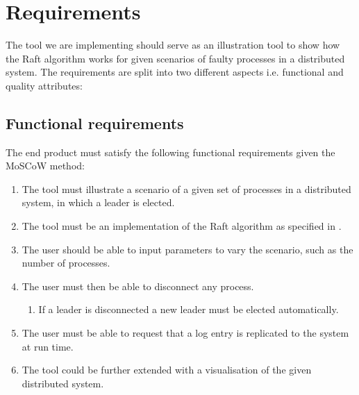 \section{Requirements} %
\label{sec:requirements}
The tool we are implementing should serve as an illustration tool to show how the Raft algorithm works for given scenarios of faulty processes in a distributed system.
The requirements are split into two different aspects i.e. functional and quality attributes:
\subsection{Functional requirements}
The end product must satisfy the following functional requirements given the MoSCoW method:
\begin{enumerate}
\item The tool must illustrate a scenario of a given set of processes in a distributed system, in which a leader is elected.
\item The tool must be an implementation of the Raft algorithm as specified in \cite{Raft}.
\item The user should be able to input parameters to vary the scenario, such as the number of processes.
\item The user must then be able to disconnect any process.
	\begin{enumerate}
	\item If a leader is disconnected a new leader must be elected automatically.
	\end{enumerate}
\item The user must be able to request that a log entry is replicated to the system at run time.
\item The tool could be further extended with a visualisation of the given distributed system.
\end{enumerate}
